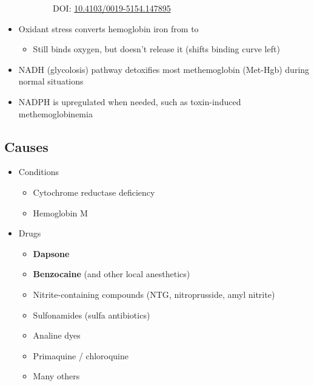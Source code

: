 \documentclass[main.tex]{subfiles}
\begin{document}
\begin{figure}[h!]
\begin{subfigure}{0.23\textwidth}
		\footnotesize DOI: \href{http://www.e-ijd.org/article.asp?issn=0019-5154;year=2015;volume=60;issue=1;spage=108;epage=108;aulast=Das}{10.4103/0019-5154.147895}
	\end{subfigure}
\end{figure}

\begin{itemize}[noitemsep]
	\item Oxidant stress converts hemoglobin iron from  to 
	\begin{itemize}[noitemsep]
		\item Still binds oxygen, but doesn't release it (shifts binding curve left)
	\end{itemize}
	\item NADH (glycolosis) pathway detoxifies most methemoglobin (Met-Hgb) during normal situations
	\item NADPH is upregulated when needed, such as toxin-induced methemoglobinemia
\end{itemize}

\subsection{Causes}
\begin{multicols}{2}
	\begin{itemize}[noitemsep]
		\item Conditions
		\begin{itemize}[noitemsep]
			\item Cytochrome  reductase deficiency
			\item Hemoglobin M
		\end{itemize}
		\item Drugs
		\begin{itemize}[noitemsep]
			\item \textbf{Dapsone}
			\item \textbf{Benzocaine} (and other local anesthetics)
			\item Nitrite-containing compounds (NTG, nitroprusside, amyl nitrite)
			\item Sulfonamides (sulfa antibiotics)
			\item Analine dyes
			\item Primaquine / chloroquine
			\item Many others
		\end{itemize}
	\end{itemize}
\end{multicols}
\end{document}
